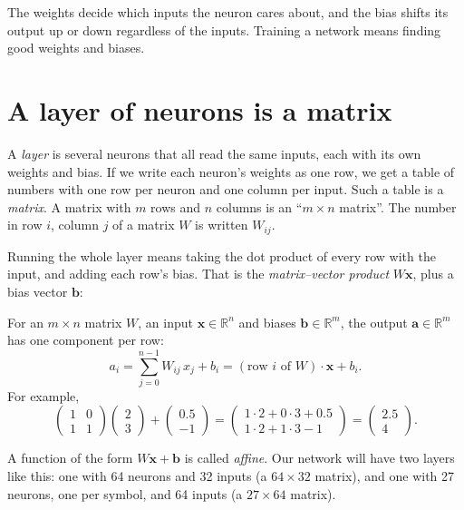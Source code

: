\documentclass[11pt,a4paper,oneside,openany]{book}
\newcommand{\R}{\mathbb{R}}
\newcommand{\vect}[1]{\mathbf{#1}}
\begin{document}
The weights decide which inputs the neuron cares about, and the bias
shifts its output up or down regardless of the inputs. Training a network
means finding good weights and biases.

\section{A layer of neurons is a matrix}

A \emph{layer} is several neurons that all read the same inputs, each with
its own weights and bias. If we write each neuron's weights as one row, we
get a table of numbers with one row per neuron and one column per input.
Such a table is a \emph{matrix}. A matrix with $m$ rows and $n$ columns is
an ``$m\times n$ matrix''. The number in row $i$, column $j$ of a matrix
$W$ is written $W_{ij}$.

Running the whole layer means taking the dot product of every row with the
input, and adding each row's bias. That is the \emph{matrix--vector
product} $W\vect{x}$, plus a bias vector $\vect{b}$:

\begin{mathbox}[A layer: $\vect{a} = W\vect{x} + \vect{b}$]
For an $m\times n$ matrix $W$, an input $\vect{x}\in\R^n$ and biases
$\vect{b}\in\R^m$, the output $\vect{a}\in\R^m$ has one component per row:
\[
  a_i = \sum_{j=0}^{n-1} W_{ij}\,x_j + b_i
      = (\text{row } i \text{ of } W)\cdot\vect{x} + b_i .
\]
For example,
\[
  \begin{pmatrix} 1 & 0 \\ 1 & 1 \end{pmatrix}
  \begin{pmatrix} 2 \\ 3 \end{pmatrix}
  + \begin{pmatrix} 0.5 \\ -1 \end{pmatrix}
  = \begin{pmatrix} 1\cdot 2 + 0\cdot 3 + 0.5 \\ 1\cdot 2 + 1\cdot 3 - 1 \end{pmatrix}
  = \begin{pmatrix} 2.5 \\ 4 \end{pmatrix}.
\]
\end{mathbox}

A function of the form $W\vect{x}+\vect{b}$ is called \emph{affine}. Our
network will have two layers like this: one with 64 neurons and 32 inputs
(a $64\times 32$ matrix), and one with 27 neurons, one per symbol, and 64
inputs (a $27\times 64$ matrix).
\end{document}
